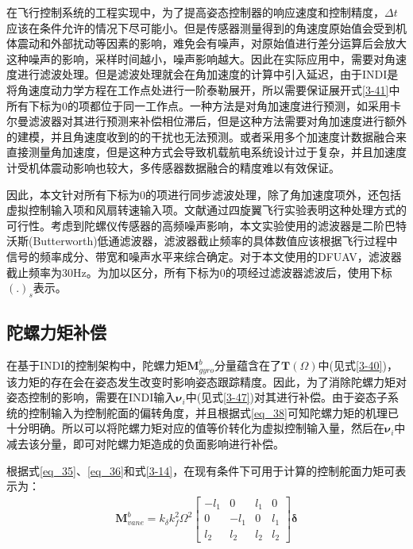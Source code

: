 在飞行控制系统的工程实现中，为了提高姿态控制器的响应速度和控制精度，$\Delta t$应该在条件允许的情况下尽可能小。但是传感器测量得到的角速度原始值会受到机体震动和外部扰动等因素的影响，难免会有噪声，对原始值进行差分运算后会放大这种噪声的影响，采样时间越小，噪声影响越大。因此在实际应用中，需要对角速度进行滤波处理。但是滤波处理就会在角加速度的计算中引入延迟，由于INDI是将角速度动力学方程在工作点处进行一阶泰勒展开，所以需要保证展开式\eqref{3-41}中所有下标为0的项都位于同一工作点。一种方法是对角加速度进行预测，如采用卡尔曼滤波器对其进行预测来补偿相位滞后，但是这种方法需要对角加速度进行额外的建模，并且角速度收到的的干扰也无法预测。或者采用多个加速度计数据融合来直接测量角加速度，但是这种方式会导致机载航电系统设计过于复杂，并且加速度计受机体震动影响也较大，多传感器数据融合的精度难以有效保证。

因此，本文针对所有下标为0的项进行同步滤波处理，除了角加速度项外，还包括虚拟控制输入项和风扇转速输入项。文献\parencite{smeurAdaptiveIncrementalNonlinear2015,smeurCascadedIncrementalNonlinear2018b}通过四旋翼飞行实验表明这种处理方式的可行性。考虑到陀螺仪传感器的高频噪声影响，本文实验使用的滤波器是二阶巴特沃斯(Butterworth)低通滤波器，滤波器截止频率的具体数值应该根据飞行过程中信号的频率成分、带宽和噪声水平来综合确定。对于本文使用的DFUAV，滤波器截止频率为30Hz。为加以区分，所有下标为0的项经过滤波器滤波后，使用下标$(.)_s$表示。

\subsection{陀螺力矩补偿}

在基于INDI的控制架构中，陀螺力矩$\boldsymbol{M}_{gyro}^b$分量蕴含在了$\boldsymbol{T}(\Omega)$中(见式\eqref{3-40})，该力矩的存在会在姿态发生改变时影响姿态跟踪精度。因此，为了消除陀螺力矩对姿态控制的影响，需要在INDI输入$\boldsymbol{\nu}_i$中(见式\eqref{3-47})对其进行补偿。由于姿态子系统的控制输入为控制舵面的偏转角度，并且根据式\eqref{eq_38}可知陀螺力矩的机理已十分明确。所以可以将陀螺力矩对应的值等价转化为虚拟控制输入量，然后在$\boldsymbol{\nu}_i$中减去该分量，即可对陀螺力矩造成的负面影响进行补偿。

根据式\eqref{eq_35}、\eqref{eq_36}和式\eqref{3-14}，在现有条件下可用于计算的控制舵面力矩可表示为：
\begin{gather}
    \boldsymbol{M}_{vane}^b=k_{\delta}k_f^2\Omega^2\begin{bmatrix}
        -l_1 & 0 & l_1 & 0 \\
        0 & -l_1 & 0 & l_1 \\
        l_2 & l_2 & l_2 & l_2
        \end{bmatrix}\boldsymbol{{\delta}}
    \label{3-50}
\end{gather}

